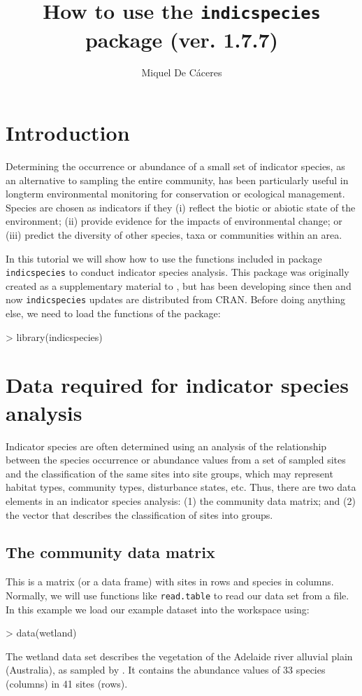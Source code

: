 \documentclass[11pt,a4paper]{article}
\title{How to use the \texttt{indicspecies} package (ver. 1.7.7)}
\author[1]{Miquel De Cáceres}
\affil[1]{CTFC - Forest Sciences and Technology Center of Catalonia, Spain}
\begin{document}

\maketitle
\tableofcontents

\section{Introduction}
Determining the occurrence or abundance of a small set of indicator species, as an alternative to sampling the entire community, has been particularly useful in longterm environmental monitoring for conservation or ecological management. Species are chosen as indicators if they (i) reflect the biotic or abiotic state of the environment; (ii) provide evidence for the impacts of environmental change; or (iii) predict the diversity of other species, taxa or communities within an area. 

In this tutorial we will show how to use the functions included in package \texttt{indicspecies} to conduct indicator species analysis. This package was originally created as a supplementary material to \citet{DeCaceres2009}, but has been developing since then and now \texttt{indicspecies} updates are distributed from CRAN. Before doing anything else, we need to load the functions of the package:
\begin{Schunk}
\begin{Sinput}
> library(indicspecies)
\end{Sinput}
\end{Schunk}

\section{Data required for indicator species analysis}
Indicator species are often determined using an analysis of the relationship between the species occurrence or abundance values from a set of sampled sites and the classification of the same sites into site groups, which may represent habitat types, community types, disturbance states, etc. Thus, there are two data elements in an indicator species analysis: (1) the community data matrix; and (2) the vector that describes the classification of sites into groups.
\subsection{The community data matrix}
This is a matrix (or a data frame) with sites in rows and species in columns. Normally, we will use functions like \texttt{read.table} to read our data set from a file. In this example we load our example dataset into the workspace using:
\begin{Schunk}
\begin{Sinput}
> data(wetland)
\end{Sinput}
\end{Schunk}
The wetland data set describes the vegetation of the Adelaide river alluvial plain (Australia), as sampled by \citet{Bowman1987}. It contains the abundance values of 33 species (columns) in 41 sites (rows).
\end{document}
